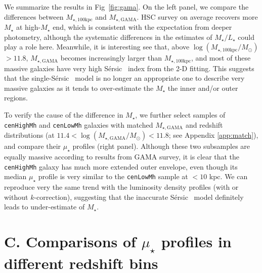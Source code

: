 \documentclass[a4paper,fleqn,usenatbib]{mnras}
\def\ser{{S\'{e}rsic\ }}
\def\rbcg{\texttt{cenHighMh}}
\def\nbcg{\texttt{cenLowMh}}
\def\mstar{{$M_{\star}$}}
\def\mtot{{$M_{\star,100\mathrm{kpc}}$}}
\def\mgama{{$M_{\star,\mathrm{GAMA}}$}}
\def\logmtot{{$\log (M_{\star,100\mathrm{kpc}}/M_{\odot})$}}
\def\logmgama{{$\log (M_{\star,\mathrm{GAMA}}/M_{\odot})$}}
\def\m2l{{$M_{\star}/L_{\star}$}}
\def\mden{{$\mu_{\star}$}}
\begin{document}
    We summarize the results in Fig~\ref{fig:gama}.  
    On the left panel, we compare the differences between \mtot{} and \mgama{}. 
    HSC survey on average recovers more \mstar{} at high-\mstar{} end, which is 
    consistent with the expectation from deeper photometry, although the 
    systematic differences in the estimates of \m2l{} could play a role here. 
    Meanwhile, it is interesting see that, above \logmtot{}$> 11.8$, \mgama{} 
    becomes increasingly larger than \mtot{}, and most of these massive 
    galaxies have very high \ser{} index from the 2-D fitting. 
    This suggests that the single-\ser{} model is no longer an appropriate one to 
    describe very massive galaxies as it tends to over-estimate the \mstar{} the 
    inner and/or outer regions. 
    
    To verify the cause of the difference in \mstar{}, we further select samples 
    of \rbcg{} and \nbcg{} galaxies with matched \mgama{} and redshift 
    distributions (at $11.4 <$\logmgama{}$<11.8$; see Appendix \ref{app:match}), 
    and compare their \mden{} profiles (right panel). 
    Although these two subsamples are equally massive according to results from 
    GAMA survey, it is clear that the \rbcg{} galaxy has much more extended 
    outer envelope, even though its median \mden{} profile is very similar 
    to the \nbcg{} sample at $< 10$ kpc. 
    We can reproduce very the same trend with the luminosity density profiles 
    (with or without $k$-correction), suggesting that the inaccurate \ser{} 
    model definitely leads to under-estimate of \mstar{}.  
 

\section{C. Comparisons of \mden{} profiles in different redshift bins}
    \label{app:redshift}
\end{document}
